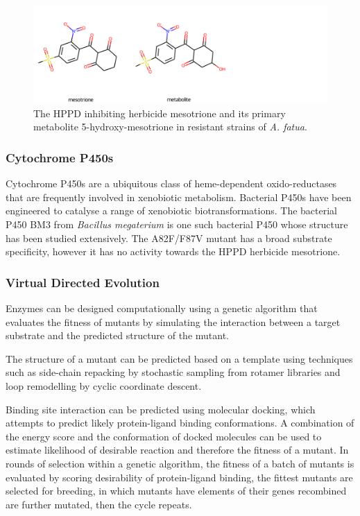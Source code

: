 \documentclass[16pt]{article}
\begin{document}
\begin{figure}
	\includegraphics[width=\textwidth]{img/mesotrione+metabolite.png}
	\caption{\label{mesotrione} The HPPD inhibiting herbicide mesotrione and its primary metabolite 5-hydroxy-mesotrione in resistant strains of \textit{A. fatua}.}
\end{figure}

\subsubsection{Cytochrome P450s}
Cytochrome P450s are a ubiquitous class of heme-dependent oxido-reductases that are frequently involved in xenobiotic metabolism. %
Bacterial P450s have been engineered to catalyse a range of xenobiotic biotransformations. 
The bacterial P450 BM3 from \textit{Bacillus megaterium} is one such bacterial P450 whose structure has been studied extensively. 
The A82F/F87V mutant has a broad substrate specificity, however it has no activity towards the HPPD herbicide mesotrione. %

\subsubsection{Virtual Directed Evolution}
Enzymes can be designed computationally using a genetic algorithm that evaluates the fitness of mutants by simulating the interaction between a target substrate and the predicted structure of the mutant. %

The structure of a mutant can be predicted based on a template using techniques such as side-chain repacking by stochastic sampling from rotamer libraries and loop remodelling by cyclic coordinate descent. %

Binding site interaction can be predicted using molecular docking, which attempts to predict likely protein-ligand binding conformations. 
A combination of the energy score and the conformation of docked molecules can be used to estimate likelihood of desirable reaction and therefore the fitness of a mutant. %
In rounds of selection within a genetic algorithm, the fitness of a batch of mutants is evaluated by scoring desirability of protein-ligand binding, the fittest mutants are selected for breeding, in which mutants have elements of their genes recombined are further mutated, then the cycle repeats.   %
\end{document}
